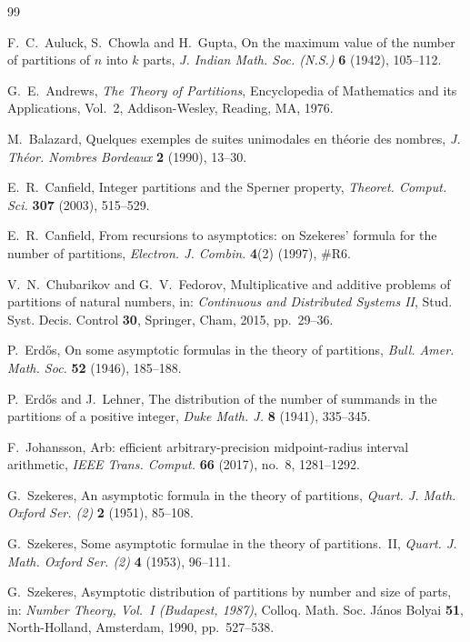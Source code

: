 \documentclass[11pt]{amsart}
\theoremstyle{definition}
\theoremstyle{remark}
\numberwithin{equation}{section}
\begin{document}
\begin{thebibliography}{99}

F.~C.~Auluck, S.~Chowla and H.~Gupta, On the maximum value of the number of partitions of $n$ into $k$ parts,
\emph{J. Indian Math. Soc. (N.S.)} \textbf{6} (1942), 105--112.

G.~E.~Andrews, \emph{The Theory of Partitions}, Encyclopedia of Mathematics and its Applications, Vol.~2, Addison-Wesley, Reading, MA, 1976.

M.~Balazard, Quelques exemples de suites unimodales en th\'eorie des nombres, \emph{J. Th\'eor. Nombres Bordeaux} \textbf{2} (1990), 13--30.

E.~R.~Canfield, Integer partitions and the Sperner property, \emph{Theoret. Comput. Sci.} \textbf{307} (2003), 515--529.

E.~R.~Canfield, From recursions to asymptotics: on Szekeres' formula for the number of partitions,
\emph{Electron. J. Combin.} \textbf{4}(2) (1997), \#R6.

V.~N.~Chubarikov and G.~V.~Fedorov, Multiplicative and additive problems of partitions of natural numbers, in:
\emph{Continuous and Distributed Systems II}, Stud. Syst. Decis. Control \textbf{30}, Springer, Cham, 2015, pp.~29--36.

P.~Erd\H{o}s, On some asymptotic formulas in the theory of partitions, \emph{Bull. Amer. Math. Soc.} \textbf{52} (1946), 185--188.

P.~Erd\H{o}s and J.~Lehner, The distribution of the number of summands in the partitions of a positive integer,
\emph{Duke Math. J.} \textbf{8} (1941), 335--345.

F.~Johansson, Arb: efficient arbitrary-precision midpoint-radius interval arithmetic,
\emph{IEEE Trans. Comput.} \textbf{66} (2017), no.~8, 1281--1292.

G.~Szekeres, An asymptotic formula in the theory of partitions, \emph{Quart. J. Math. Oxford Ser. (2)} \textbf{2} (1951), 85--108.

G.~Szekeres, Some asymptotic formulae in the theory of partitions.~II, \emph{Quart. J. Math. Oxford Ser. (2)} \textbf{4} (1953), 96--111.

G.~Szekeres, Asymptotic distribution of partitions by number and size of parts, in: \emph{Number Theory, Vol.~I (Budapest, 1987)},
Colloq. Math. Soc. J\'anos Bolyai \textbf{51}, North-Holland, Amsterdam, 1990, pp.~527--538.

\end{thebibliography}
\end{document}
